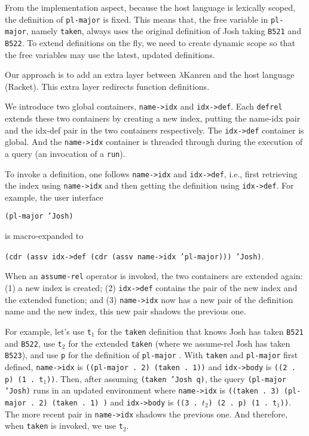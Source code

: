 \documentclass[acmlarge,review]{acmart}
\theoremstyle{definition}
\begin{document}
From the implementation aspect, because the host language is lexically scoped,
the definition of \texttt{pl-major} is fixed. This means that, the free variable
in \texttt{pl-major}, namely \texttt{taken}, always uses the
original definition of Josh taking \texttt{B521} and \texttt{B522}. 
To extend definitions on the fly, we need to create dynamic scope so that the
free variables may use the latest, updated definitions.

Our approach is to add an extra layer between $\lambda$Kanren and the host
language (Racket). This extra layer redirects function definitions.

We introduce two global containers,
\texttt{name->idx} and \texttt{idx->def}. Each \texttt{defrel} extends these
two containers by creating a new index, putting the name-idx pair and the
idx-def pair in the two containers respectively.
The \texttt{idx->def} container is global. And the \texttt{name->idx}
container is threaded through during the execution of
a query (an invocation of a \texttt{run}).

To invoke a definition, one follows \texttt{name->idx} and
\texttt{idx->def}, i.e., first retrieving the index using \texttt{name->idx}
and then getting the definition using \texttt{idx->def}.
For example, the user interface

{\centering
  \texttt{(pl-major 'Josh)}

}
is macro-expanded to

{\centering
\texttt{(cdr (assv idx->def (cdr (assv name->idx 'pl-major))) 'Josh)}.

}

When an \texttt{assume-rel} operator is invoked, the two containers are extended
again: (1) a new index is created; (2) \texttt{idx->def} contains the pair of
the new index and the extended function; and (3) \texttt{name->idx} now has
a new pair of the definition name and the new index, this new pair shadows the
previous one.

For example, let's use \texttt{t$_1$} for the \texttt{taken} definition
that knows Josh has taken \texttt{B521} and \texttt{B522},
use \texttt{t$_2$} for the extended \texttt{taken}
(where we assume-rel Josh has taken \texttt{B523}), and use \texttt{p} for
the definition of \texttt{pl-major} .
With \texttt{taken} and \texttt{pl-major} first defined,
\texttt{name->idx} is \texttt{((pl-major . 2) (taken . 1))}
and \texttt{idx->body} is \mbox{\texttt{((2 . p) (1 . t$_1$))}}.
Then, after assuming \texttt{(taken 'Josh q)}, the query \texttt{(pl-major 'Josh)}
runs in an updated environment where 
\texttt{name->idx} is \texttt{((taken . 3) (pl-major . 2) (taken . 1) )}
and \texttt{idx->body} is \mbox{\texttt{((3 . $t_2$) (2 . p) (1 . t$_1$))}}.
The more recent pair in \texttt{name->idx} shadows the previous one. And therefore,
when \texttt{taken} is invoked, we use \texttt{t$_2$}.
\end{document}
